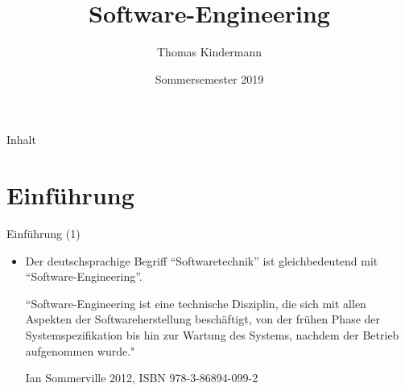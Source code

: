 \documentclass[aspectratio=169]{beamer}
\title[Your Short Title]{Software-Engineering}
\author{Thomas Kindermann}
\institute{HSRW}
\date{Sommersemester 2019}
\begin{document}
\begin{frame}
  \titlepage
\end{frame}

\begin{frame}{Inhalt}
  \tableofcontents
\end{frame}

\section{Einführung}
\begin{frame}{Einführung (1)}
\begin{itemize}
  \item Der deutschsprachige Begriff “Softwaretechnik” ist gleichbedeutend mit “Software-Engineering”.

“Software-Engineering ist eine technische Disziplin, die sich mit allen Aspekten der Softwareherstellung beschäftigt, von der frühen Phase der Systemspezifikation bis hin zur Wartung des Systems, nachdem der Betrieb aufgenommen wurde."

Ian Sommerville 2012, ISBN 978-3-86894-099-2
\end{itemize}
\end{frame}
\end{document}
